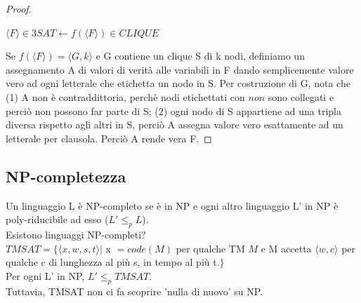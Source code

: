 \documentclass[a4paper, 12pt]{article}
\begin{document}
\begin{proof}
\begin{center}
$\langle F \rangle \in 3SAT \leftarrow f(\langle F \rangle) \in CLIQUE$
\end{center}
Se $f(\langle F \rangle) = \langle G, k \rangle$ e G contiene un clique S di k nodi, definiamo un assegnamento A di valori di verit\`a alle variabili in F dando semplicemente valore vero ad ogni letterale che etichetta un nodo in S. Per costruzione di G, nota che (1) A non \`e  contraddittoria, perch\`e nodi etichettati con $non$ sono collegati e perci\`o non possono far parte di S; (2) ogni nodo di S appartiene ad una tripla diversa rispetto agli altri in S, perci\`o A assegna valore vero esattamente ad un letterale per clausola. Perci\`o A rende vera F. 
\end{proof}
\subsection{NP-completezza}
Un linguaggio L \`e NP-completo se \`e in NP e ogni altro linguaggio L' in NP \`e poly-riducibile ad esso ($L' \leq_p L$).\\
Esistono linguaggi NP-completi?\\
$TMSAT = \{ \langle x,w,s,t \rangle |$ x $=code(M)$ per qualche TM $M$ e M accetta $\langle w, c \rangle$ per qualche c di lunghezza al pi\`u s, in tempo al pi\`u t.$ \}$\\
Per ogni L' in NP, $L' \leq_p TMSAT$.\\
Tuttavia, TMSAT non ci fa scoprire 'nulla di nuovo' su NP.
\end{document}

